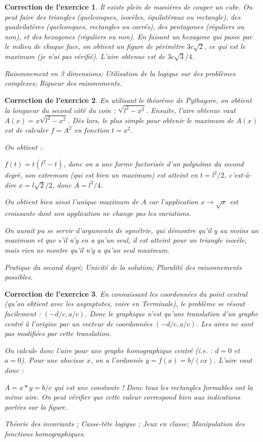 \documentclass[12pt]{article}
\theoremstyle{break}
\newtheorem{cor}{Correction de l'exercice}
\begin{document}
\begin{cor}
Il existe plein de manières de couper un cube. On peut faire des triangles (quelconques, isocèles, équilatéraux ou rectangle), des quadrilatères (quelconques, rectangles ou carrés), des pentagones (réguliers ou non), et des hexagones (réguliers ou non). En faisant un hexagone qui passe par le milieu de chaque face, on obtient un figure de périmètre $3c \sqrt{2}$, ce qui est le maximum (je n'ai pas vérifié). L'aire obtenue est de $3c \sqrt{3}/4$.

\textit{Raisonnement en 3 dimensions; Utilisation de la logique sur des problèmes complexes; Rigueur des raisonnments.}

\end{cor}


\begin{cor}
En utilisant le théorème de Pythagore, on obtient la longueur du second côté du coin : $\sqrt{l^2 - x^2}$. Ensuite, l'aire obtenue vaut $A(x) = x \sqrt{l^2 - x^2}$. Dès lors, le plus simple pour obtenir le maximum de $A(x)$ est de calculer $f = A^2$ en fonction $t = x^2$.

On obtient :

$f(t) = t(l^2-t)$, donc on a une forme factorisée d'un polynôme du second degré, son extremum (qui est bien un maximum) est atteint en $t = l^2/2$, c'est-à-dire $x = l \sqrt{2}/2$, donc $A = l^2/4$.

On obtient bien ainsi l'unique maximum de $A$ car l'application $x \rightarrow \sqrt{x}$ est croissante dont son application ne change pas les variations.

On aurait pu se servir d'arguments de symétrie, qui démontre qu'il y au moins un maximum et que s'il n'y en a qu'un seul, il est atteint pour un triangle isocèle, mais rien ne montre qu'il n'y a qu'un seul maximum. \newline

\textit{Pratique du second degré; Unicité de la solution; Pluralité des raisonnements possibles. }
\end{cor}


\begin{cor}
En connaissant les coordonnées du point central (qu'on obtient avec les asymptotes, voire en Terminale), le problème se résout facilement : $(-d/c, a/c)$. Donc le graphique n'est qu'une translation d'un graphe centré à l'origine par un vecteur de coordonnées $(-d/c, a/c)$. Les aires ne sont pas modifiées par cette translation.

On calcule donc l'aire pour une graphe homographique centré (i.e. : $d = 0$ et $a = 0$). Pour une abscisse $x$, on a l'ordonnée $y = f(x) = b/(cx)$. L'aire vaut donc :

$A = x*y = b/c$ qui est une constante ! Donc tous les rectangles formables ont la même aire. On peut vérifier que cette valeur correspond bien aux indications portées sur la figure.

\textit{Théorie des invariants ; Casse-tête logique ; Jeux en classe; Manipulation des fonctions homographiques.}
\end{cor}
\end{document}
